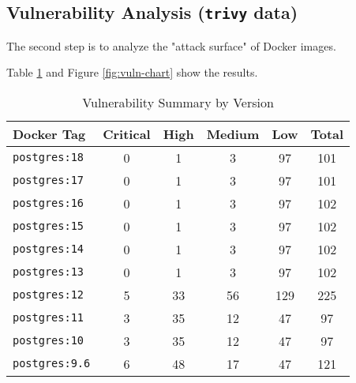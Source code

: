 \documentclass[11pt, a4paper]{article}
\begin{document}
\subsection{Vulnerability Analysis (\texttt{trivy} data)}

The second step is to analyze the "attack surface" of Docker images.

Table \ref{tab:trivy} and Figure \ref{fig:vuln-chart} show the results.

\begin{table}[h!]
\centering
\caption{Vulnerability Summary by Version}
\label{tab:trivy}
\begin{tabular}{@{}lccccc@{}}
	\textbf{Docker Tag} & \textbf{Critical} & \textbf{High} & \textbf{Medium} & \textbf{Low} & \textbf{Total} \\ \midrule
\rowcolor{lightgreen} \texttt{postgres:18} & 0 & 1 & 3 & 97 & 101 \\
\rowcolor{lightgreen} \texttt{postgres:17} & 0 & 1 & 3 & 97 & 101 \\
\rowcolor{lightgreen} \texttt{postgres:16} & 0 & 1 & 3 & 97 & 102 \\
\rowcolor{lightgreen} \texttt{postgres:15} & 0 & 1 & 3 & 97 & 102 \\
\rowcolor{lightgreen} \texttt{postgres:14} & 0 & 1 & 3 & 97 & 102 \\
\rowcolor{lightgreen} \texttt{postgres:13} & 0 & 1 & 3 & 97 & 102 \\ \midrule
\rowcolor{lightorange} \texttt{postgres:12} & 5 & 33 & 56 & 129 & 225 \\
\rowcolor{lightred} \texttt{postgres:11} & 3 & 35 & 12 & 47 & 97 \\
\rowcolor{lightred} \texttt{postgres:10} & 3 & 35 & 12 & 47 & 97 \\
\rowcolor{lightred} \texttt{postgres:9.6} & 6 & 48 & 17 & 47 & 121 \\ \bottomrule
\end{tabular}
\end{table}
\end{document}
